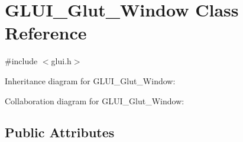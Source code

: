 \hypertarget{class_g_l_u_i___glut___window}{\section{G\+L\+U\+I\+\_\+\+Glut\+\_\+\+Window Class Reference}
\label{class_g_l_u_i___glut___window}
}


{\ttfamily \#include $<$glui.\+h$>$}



Inheritance diagram for G\+L\+U\+I\+\_\+\+Glut\+\_\+\+Window\+:


Collaboration diagram for G\+L\+U\+I\+\_\+\+Glut\+\_\+\+Window\+:
\subsection*{Public Attributes}
